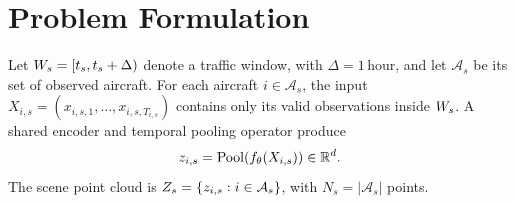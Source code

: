 \section{Problem Formulation}
\label{sec:problem}
Let $W_s=[t_s,t_s+\Delta)$ denote a traffic window, with
$\Delta=1\,\mathrm{hour}$, and let $\mathcal{A}_s$ be its set of observed
aircraft. For each aircraft $i\in\mathcal{A}_s$, the input
$X_{i,s}=(x_{i,s,1},\ldots,x_{i,s,T_{i,s}})$ contains only its valid
observations inside $W_s$. A shared encoder and temporal pooling
operator produce
\begin{equation}
z_{i,s}=\operatorname{Pool}(f_\theta(X_{i,s}))\in\mathbb{R}^d.
\end{equation}
The scene point cloud is
$Z_s=\{z_{i,s}:i\in\mathcal{A}_s\}$, with
$N_s=|\mathcal{A}_s|$ points.
